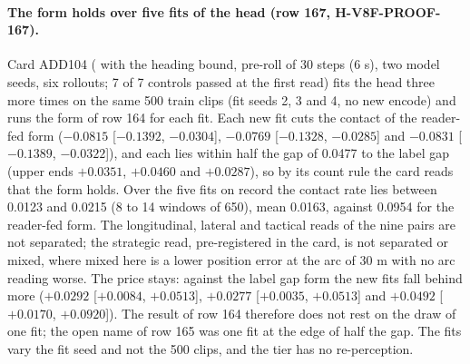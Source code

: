 \paragraph{The form holds over five fits of the head (row 167, H-V8F-PROOF-167).} Card ADD104 ( with the heading bound, pre-roll of 30 steps (6 s), two model seeds, six rollouts; 7 of 7 controls passed at the first read) fits the head three more times on the same 500 train clips (fit seeds 2, 3 and 4, no new encode) and runs the form of row 164 for each fit. Each new fit cuts the contact of the reader-fed form ($-0.0815$ [$-0.1392$, $-0.0304$], $-0.0769$ [$-0.1328$, $-0.0285$] and $-0.0831$ [$-0.1389$, $-0.0322$]), and each lies within half the gap of 0.0477 to the label gap (upper ends $+0.0351$, $+0.0460$ and $+0.0287$), so by its count rule the card reads that the form holds. Over the five fits on record the contact rate lies between 0.0123 and 0.0215 (8 to 14 windows of 650), mean 0.0163, against 0.0954 for the reader-fed form. The longitudinal, lateral and tactical reads of the nine pairs are not separated; the strategic read, pre-registered in the card, is not separated or mixed, where mixed here is a lower position error at the arc of 30 m with no arc reading worse. The price stays: against the label gap form the new fits fall behind more ($+0.0292$ [$+0.0084$, $+0.0513$], $+0.0277$ [$+0.0035$, $+0.0513$] and $+0.0492$ [$+0.0170$, $+0.0920$]). The result of row 164 therefore does not rest on the draw of one fit; the open name of row 165 was one fit at the edge of half the gap. The fits vary the fit seed and not the 500 clips, and the tier has no re-perception.
